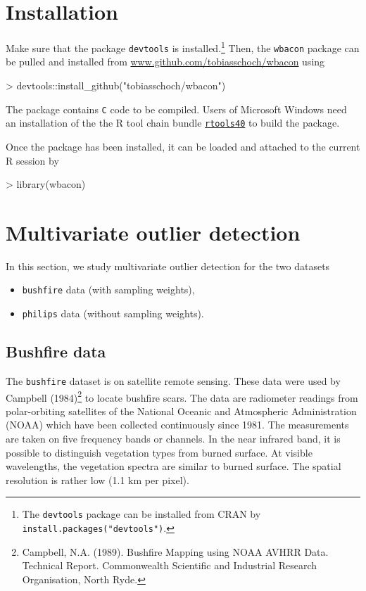 \documentclass[a4paper,oneside,11pt,DIV=12]{scrartcl}
\newcommand{\code}[1]{{\texttt{#1}}}
\begin{document}
\section{Installation}\label{sec:installation}
Make sure that the package \code{devtools} is installed.\footnote{The
\code{devtools} package can be installed from CRAN by
\code{install.packages("devtools")}.} Then, the \code{wbacon} package can be
pulled and installed from
\href{https://www.github.com/tobiasschoch/cbacon}{www.github.com/tobiasschoch/wbacon}
using 

\begin{Schunk}
\begin{Sinput}
> devtools::install_github("tobiasschoch/wbacon")
\end{Sinput}
\end{Schunk}

\noindent The package contains \code{C} code to be compiled. Users of Microsoft
Windows need an installation of the the R tool chain bundle
\href{https://cran.r-project.org/bin/windows/Rtools/}{\code{rtools40}} to build
the package. 

Once the package has been installed, it can be loaded and attached to the 
current R session by 
\begin{Schunk}
\begin{Sinput}
> library(wbacon)
\end{Sinput}
\end{Schunk}


\section{Multivariate outlier detection}\label{sec:multivariate}
In this section, we study multivariate outlier detection for the two datasets
\begin{itemize}
	\item \code{bushfire} data (with sampling weights),
	\item \code{philips} data (without sampling weights).
\end{itemize}

\subsection{Bushfire data}
The \code{bushfire} dataset is on satellite remote sensing. These data were used by Campbell (1984)\footnote{Campbell, N.A. (1989). Bushfire Mapping using NOAA AVHRR Data. Technical Report. Commonwealth Scientific and Industrial Research Organisation, North Ryde.} to locate bushfire scars. The data are radiometer readings from polar-orbiting satellites of the National Oceanic and Atmospheric Administration (NOAA) which have been collected continuously since 1981. The measurements are taken on five frequency bands or channels. In the near infrared band, it is possible to distinguish vegetation types from burned surface. At visible wavelengths, the vegetation spectra are similar to burned surface. The spatial resolution is rather low (1.1 km per pixel). 
\end{document}
